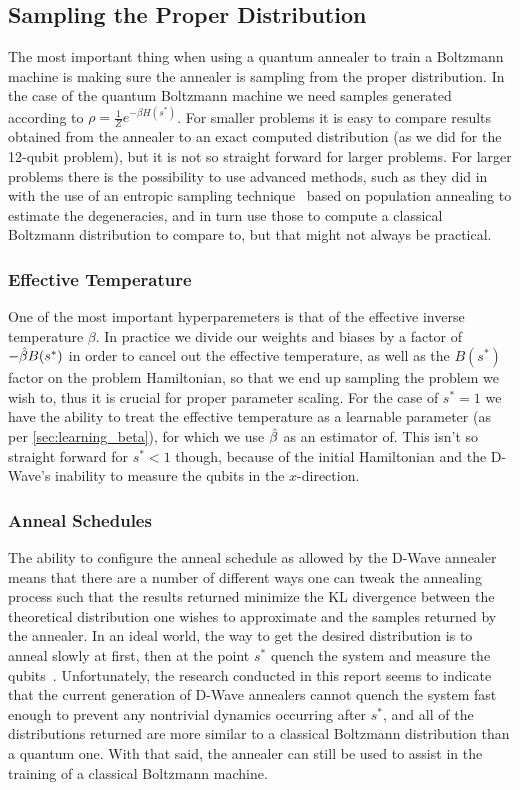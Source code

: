 \subsection{Sampling the Proper Distribution}
The most important thing when using a quantum annealer to train a Boltzmann machine is making sure the annealer is sampling from the proper distribution.
In the case of the quantum Boltzmann machine we need samples generated according to \( \rho = \frac{1}{Z} e^{-\beta H(s^*)} \).
For smaller problems it is easy to compare results obtained from the annealer to an exact computed distribution (as we did for the 12-qubit problem), but it is not so straight forward for larger problems.
For larger problems there is the possibility to use advanced methods, such as they did in~\cite{marshall_2019} with the use of an entropic sampling technique~\cite{barash_2019} based on population annealing to estimate the degeneracies, and in turn use those to compute a classical Boltzmann distribution to compare to, but that might not always be practical.

\subsubsection{Effective Temperature}
One of the most important hyperparemeters is that of the effective inverse temperature \( \beta \).
In practice we divide our weights and biases by a factor of \( -\hat{\beta} B(s^*) \) in order to cancel out the effective temperature, as well as the \( B(s^*) \) factor on the problem Hamiltonian, so that we end up sampling the problem we wish to, thus it is crucial for proper parameter scaling.
For the case of \( s^* = 1 \) we have the ability to treat the effective temperature as a learnable parameter (as per \cref{sec:learning_beta}), for which we use \( \hat{\beta} \) as an estimator of.
This isn't so straight forward for \( s^* < 1 \) though, because of the initial Hamiltonian and the D-Wave's inability to measure the qubits in the \( x \)-direction.

\subsubsection{Anneal Schedules}
The ability to configure the anneal schedule as allowed by the D-Wave annealer means that there are a number of different ways one can tweak the annealing process such that the results returned minimize the KL divergence between the theoretical distribution one wishes to approximate and the samples returned by the annealer.
In an ideal world, the way to get the desired distribution is to anneal slowly at first, then at the point \( s^* \) quench the system and measure the qubits~\cite{amin_2018}.
Unfortunately, the research conducted in this report seems to indicate that the current generation of D-Wave annealers cannot quench the system fast enough to prevent any nontrivial dynamics occurring after \( s^* \), and all of the distributions returned are more similar to a classical Boltzmann distribution than a quantum one.
With that said, the annealer can still be used to assist in the training of a classical Boltzmann machine.

